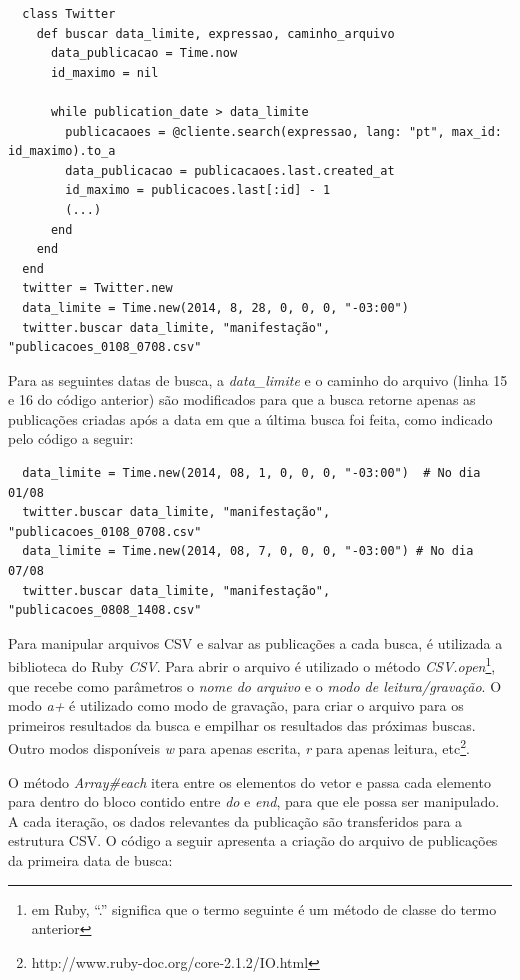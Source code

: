 \begin{lstlisting}
  class Twitter
    def buscar data_limite, expressao, caminho_arquivo
      data_publicacao = Time.now
      id_maximo = nil

      while publication_date > data_limite
        publicacaoes = @cliente.search(expressao, lang: "pt", max_id: id_maximo).to_a
        data_publicacao = publicacaoes.last.created_at
        id_maximo = publicacoes.last[:id] - 1
        (...)
      end
    end
  end
  twitter = Twitter.new
  data_limite = Time.new(2014, 8, 28, 0, 0, 0, "-03:00")
  twitter.buscar data_limite, "manifestação", "publicacoes_0108_0708.csv"
\end{lstlisting}

Para as seguintes datas de busca, a \textit{data\_limite} e o caminho do arquivo (linha 15 e 16 do código anterior) são modificados para que a busca retorne apenas as publicações criadas após a data em que a última busca foi feita, como indicado pelo código a seguir:

\begin{lstlisting}
  data_limite = Time.new(2014, 08, 1, 0, 0, 0, "-03:00")  # No dia 01/08
  twitter.buscar data_limite, "manifestação", "publicacoes_0108_0708.csv"
  data_limite = Time.new(2014, 08, 7, 0, 0, 0, "-03:00") # No dia 07/08
  twitter.buscar data_limite, "manifestação", "publicacoes_0808_1408.csv"
\end{lstlisting}

Para manipular arquivos CSV e salvar as publicações a cada busca, é utilizada a biblioteca do Ruby \textit{CSV}. Para abrir o arquivo é utilizado o método \textit{CSV.open}\footnote{em Ruby, ``.'' significa que o termo seguinte é um método de classe do termo anterior}, que recebe como parâmetros o \textit{nome do arquivo} e o \textit{modo de leitura/gravação}. O modo \textit{a+} é utilizado como modo de gravação, para criar o arquivo para os primeiros resultados da busca e empilhar os resultados das próximas buscas. Outro modos disponíveis \textit{w} para apenas escrita, \textit{r} para apenas leitura, etc\footnote{http://www.ruby-doc.org/core-2.1.2/IO.html}. 

O método \textit{Array\#each} itera entre os elementos do vetor e passa cada elemento para dentro do bloco contido entre \textit{do} e \textit{end}, para que ele possa ser manipulado. A cada iteração, os dados relevantes da publicação são transferidos para a estrutura CSV. O código a seguir apresenta a criação do arquivo de publicações da primeira data de busca:

